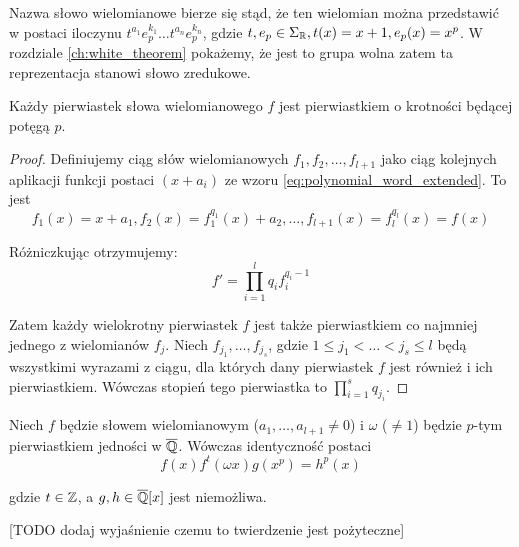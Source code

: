 Nazwa słowo wielomianowe bierze się stąd, że ten wielomian można przedstawić w
postaci iloczynu $t^{a_1}e_p^{k_1} \ldots t^{a_n}e_p^{k_n}$, gdzie $t, e_p \in
\Sigma_{\mathbb{R}}, t(x) = x + 1, e_p(x) = x^p$. W rozdziale \ref{ch:white_theorem}
pokażemy, że jest to grupa wolna zatem ta reprezentacja stanowi słowo
zredukowe.

\begin{lemma}
  Każdy pierwiastek słowa wielomianowego $f$ jest pierwiastkiem o krotności
  będącej potęgą $p$.
  \label{lem:multiplicity_lemma}
\end{lemma}

\begin{proof}
Definiujemy ciąg słów wielomianowych $f_1, f_2, \ldots, f_{l+1}$ jako ciąg
kolejnych aplikacji funkcji postaci $(x+a_i)$ ze wzoru
\ref{eq:polynomial_word_extended}.
To jest
\[f_1(x) = x + a_1, f_2(x) = f_1^{q_1}(x) + a_2, \ldots, f_{l+1}(x) =
f_l^{q_l}(x) = f(x)\]

Różniczkując otrzymujemy:
\[f' = \prod_{i=1}^l q_i f_i^{q_i - 1}\]

Zatem każdy wielokrotny pierwiastek $f$ jest także pierwiastkiem co najmniej
jednego z wielomianów $f_j$. Niech $f_{j_1}, \ldots, f_{j_s}$, gdzie $1 \leq j_1
< \ldots < j_s \leq l$ będą wszystkimi wyrazami z ciągu, dla których dany
pierwiastek $f$ jest również i ich pierwiastkiem. Wówczas stopień tego
pierwiastka to $\prod_{i=1}^s q_{j_i}$.
\end{proof}

\begin{lemma}
  Niech $f$ będzie słowem wielomianowym ($a_1, \ldots, a_{l+1} \neq 0$) i
  $\omega$ ($\neq 1$) będzie $p$-tym pierwiastkiem jedności w $\overline{\mathbb{Q}}$.
  Wówczas identyczność postaci
  \begin{equation}
    f(x)f^t(\omega x)g\left(x^p\right) = h^p(x)
    \label{eq:polynomial_lemma}
  \end{equation}

  gdzie $t \in \mathbb{Z}$, a $g, h \in \overline{\mathbb{Q}}[x]$ jest niemożliwa.
  \label{lem:main_polynomial_lemma}
\end{lemma}

[TODO dodaj wyjaśnienie czemu to twierdzenie jest pożyteczne]


